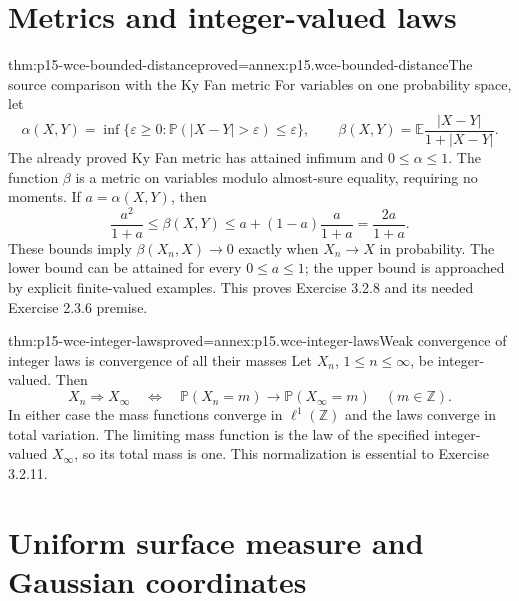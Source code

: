 \section{Metrics and integer-valued laws}
\label{sec:p15-wce-metrics-lattices}

\begin{hbtheorem}{thm:p15-wce-bounded-distance}{proved=annex:p15.wce-bounded-distance}{The source comparison with the Ky Fan metric}
For variables on one probability space, let
\[
 \alpha(X,Y)=\inf\{\varepsilon\geq0:
               \mathbb P(|X-Y|>\varepsilon)\leq\varepsilon\},
 \qquad
 \beta(X,Y)=\mathbb E\frac{|X-Y|}{1+|X-Y|}.
 \]
The already proved Ky Fan metric has attained infimum and
\(0\leq\alpha\leq1\).
The function \(\beta\) is a metric on variables modulo
almost-sure equality, requiring no moments.
If \(a=\alpha(X,Y)\), then
\[
 \frac{a^2}{1+a}\leq\beta(X,Y)
       \leq a+(1-a)\frac a{1+a}=\frac{2a}{1+a}.
 \]
These bounds imply
\(\beta(X_n,X)\to0\) exactly when \(X_n\to X\) in probability.
The lower bound can be attained for every \(0\leq a\leq1\);
the upper bound is approached by explicit finite-valued examples.
This proves Exercise 3.2.8 and its needed Exercise 2.3.6 premise.
\end{hbtheorem}

\begin{hbtheorem}{thm:p15-wce-integer-laws}{proved=annex:p15.wce-integer-laws}{Weak convergence of integer laws is convergence of all their masses}
Let \(X_n\), \(1\leq n\leq\infty\), be integer-valued.
Then
\[
 X_n\Rightarrow X_\infty
 \quad\Longleftrightarrow\quad
 \mathbb P(X_n=m)\longrightarrow\mathbb P(X_\infty=m)
                                      \quad(m\in\mathbb Z).
 \]
In either case the mass functions converge in \(\ell^1(\mathbb Z)\)
and the laws converge in total variation.
The limiting mass function is the law of the specified
integer-valued \(X_\infty\), so its total mass is one.
This normalization is essential to Exercise 3.2.11.
\end{hbtheorem}

\section{Uniform surface measure and Gaussian coordinates}
\label{sec:p15-wce-sphere}

